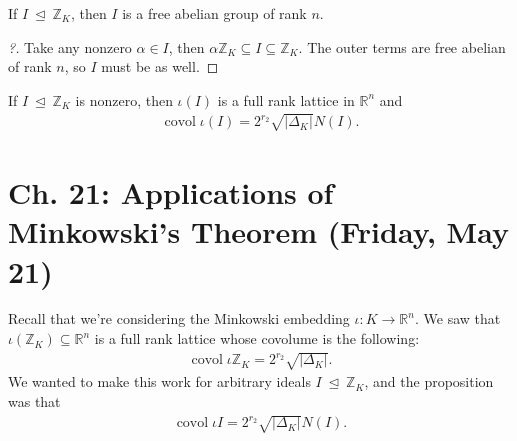 \begin{lemma}[?]

If \(I{~\trianglelefteq~}{\mathbb{Z}}_K\), then \(I\) is a free abelian
group of rank \(n\).

\end{lemma}

\begin{proof}[?]

Take any nonzero \(\alpha\in I\), then
\(\alpha {\mathbb{Z}}_K \subseteq I \subseteq {\mathbb{Z}}_K\). The
outer terms are free abelian of rank \(n\), so \(I\) must be as well.

\end{proof}

\begin{proposition}[?]

If \(I{~\trianglelefteq~}{\mathbb{Z}}_K\) is nonzero, then \(\iota(I)\)
is a full rank lattice in \({\mathbb{R}}^n\) and
\begin{align*}
\operatorname{covol}\iota(I) = 2^{r_2} \sqrt{{\left\lvert {{\Delta}_K} \right\rvert}} N(I)
.\end{align*}

\end{proposition}

\hypertarget{ch.-21-applications-of-minkowskis-theorem-friday-may-21}{%
\section{Ch. 21: Applications of Minkowski's Theorem (Friday, May
21)}\label{ch.-21-applications-of-minkowskis-theorem-friday-may-21}}

\begin{remark}

Recall that we're considering the Minkowski embedding
\(\iota: K\to{\mathbb{R}}^n\). We saw that
\(\iota({\mathbb{Z}}_K)\subseteq {\mathbb{R}}^n\) is a full rank lattice
whose covolume is the following:
\begin{align*}
\operatorname{covol}\iota {\mathbb{Z}}_K = 2^{r_2} \sqrt{ {\left\lvert { {\Delta}_K} \right\rvert}}
.\end{align*}
We wanted to make this work for arbitrary ideals
\(I{~\trianglelefteq~}{\mathbb{Z}}_K\), and the proposition was that
\begin{align*}
\operatorname{covol}\iota I = 2^{r_2} \sqrt{ {\left\lvert { {\Delta}_K} \right\rvert}} N(I)
.\end{align*}

\end{remark}

